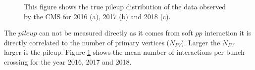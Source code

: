 \begin{figure}%
    \centering

    \qquad
    \qquad
    \caption{This figure shows the true pileup distribution of the data observed by the CMS \cite{Chatrchyan:cms_detetectors} for 2016 (a), 2017 (b) and 2018 (c).}%
    \label{analysis:pu_lumipog}%
\end{figure}
The $pileup$ can not be measured directly as it comes from soft $pp$ interaction it is directly correlated to the number of primary vertices ($N_{PV}$). Larger the $N_{PV}$ larger is the pileup. Figure \ref{analysis:pu_lumipog} shows the mean number of interactions per bunch crossing for the year 2016, 2017 and 2018. 

